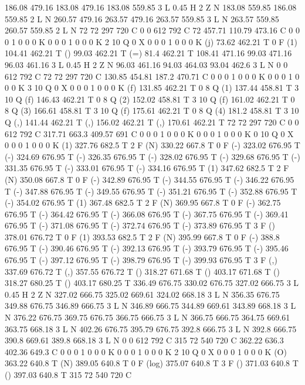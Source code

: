186.08 479.16 183.08 479.16 183.08 559.85 3 L
0.45 H
2 Z
N
183.08 559.85 186.08 559.85 2 L
N
260.57 479.16 263.57 479.16 263.57 559.85 3 L
N
263.57 559.85 260.57 559.85 2 L
N
72 72 297 720 C
0 0 612 792 C
72 457.71 110.79 473.16 C
0 0 0 1 0 0 0 K
0 0 0 1 0 0 0 K
2 10 Q
0 X
0 0 0 1 0 0 0 K
(j) 73.62 462.21 T
0 F
(1) 104.41 462.21 T
() 99.03 462.21 T
(=) 81.4 462.21 T
108.41 471.16 99.03 471.16 96.03 461.16 3 L
0.45 H
2 Z
N
96.03 461.16 94.03 464.03 93.04 462.6 3 L
N
0 0 612 792 C
72 72 297 720 C
130.85 454.81 187.2 470.71 C
0 0 0 1 0 0 0 K
0 0 0 1 0 0 0 K
3 10 Q
0 X
0 0 0 1 0 0 0 K
(f) 131.85 462.21 T
0 8 Q
(1) 137.44 458.81 T
3 10 Q
(f) 146.43 462.21 T
0 8 Q
(2) 152.02 458.81 T
3 10 Q
(f) 161.02 462.21 T
0 8 Q
(3) 166.61 458.81 T
3 10 Q
(f) 175.61 462.21 T
0 8 Q
(4) 181.2 458.81 T
3 10 Q
(,) 141.44 462.21 T
(,) 156.02 462.21 T
(,) 170.61 462.21 T
72 72 297 720 C
0 0 612 792 C
317.71 663.3 409.57 691 C
0 0 0 1 0 0 0 K
0 0 0 1 0 0 0 K
0 10 Q
0 X
0 0 0 1 0 0 0 K
(1) 327.76 682.5 T
2 F
(N) 330.22 667.8 T
0 F
(-) 323.02 676.95 T
(-) 324.69 676.95 T
(-) 326.35 676.95 T
(-) 328.02 676.95 T
(-) 329.68 676.95 T
(-) 331.35 676.95 T
(-) 333.01 676.95 T
(-) 334.16 676.95 T
(1) 347.62 682.5 T
2 F
(N) 350.08 667.8 T
0 F
(-) 342.89 676.95 T
(-) 344.55 676.95 T
(-) 346.22 676.95 T
(-) 347.88 676.95 T
(-) 349.55 676.95 T
(-) 351.21 676.95 T
(-) 352.88 676.95 T
(-) 354.02 676.95 T
(1) 367.48 682.5 T
2 F
(N) 369.95 667.8 T
0 F
(-) 362.75 676.95 T
(-) 364.42 676.95 T
(-) 366.08 676.95 T
(-) 367.75 676.95 T
(-) 369.41 676.95 T
(-) 371.08 676.95 T
(-) 372.74 676.95 T
(-) 373.89 676.95 T
3 F
() 378.01 676.72 T
0 F
(1) 393.53 682.5 T
2 F
(N) 395.99 667.8 T
0 F
(-) 388.8 676.95 T
(-) 390.46 676.95 T
(-) 392.13 676.95 T
(-) 393.79 676.95 T
(-) 395.46 676.95 T
(-) 397.12 676.95 T
(-) 398.79 676.95 T
(-) 399.93 676.95 T
3 F
(,) 337.69 676.72 T
(,) 357.55 676.72 T
() 318.27 671.68 T
() 403.17 671.68 T
() 318.27 680.25 T
() 403.17 680.25 T
336.49 676.75 330.02 676.75 327.02 666.75 3 L
0.45 H
2 Z
N
327.02 666.75 325.02 669.61 324.02 668.18 3 L
N
356.35 676.75 349.88 676.75 346.89 666.75 3 L
N
346.89 666.75 344.89 669.61 343.89 668.18 3 L
N
376.22 676.75 369.75 676.75 366.75 666.75 3 L
N
366.75 666.75 364.75 669.61 363.75 668.18 3 L
N
402.26 676.75 395.79 676.75 392.8 666.75 3 L
N
392.8 666.75 390.8 669.61 389.8 668.18 3 L
N
0 0 612 792 C
315 72 540 720 C
362.22 636.3 402.36 649.3 C
0 0 0 1 0 0 0 K
0 0 0 1 0 0 0 K
2 10 Q
0 X
0 0 0 1 0 0 0 K
(O) 363.22 640.8 T
(N) 389.05 640.8 T
0 F
(log) 375.07 640.8 T
3 F
() 371.03 640.8 T
() 397.03 640.8 T
315 72 540 720 C

